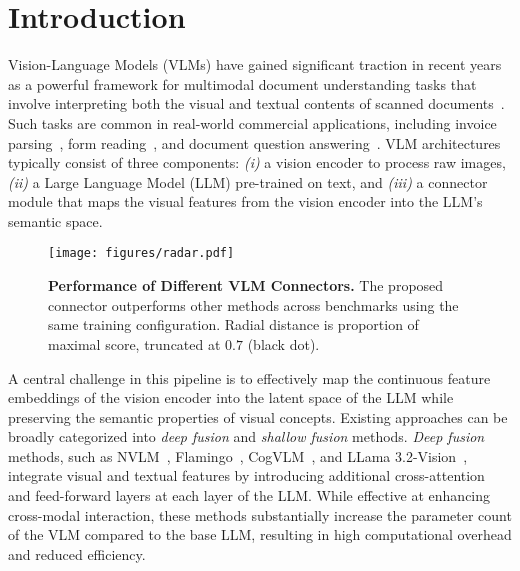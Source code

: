
\section{Introduction}
\label{section:introduction}


Vision-Language Models (VLMs) have gained significant traction in recent years as a powerful framework for multimodal document understanding tasks that involve interpreting both the visual and textual contents of scanned documents~\citep{donut, pix2struct, liu2023improvedllava, liu2024llavanext, hu2024mplugdocowl15unifiedstructure, wang2023docllmlayoutawaregenerativelanguage, rodriguez2024starvector}. Such tasks are common in real-world commercial applications, including invoice parsing~\citep{park2019cord}, form reading~\citep{funsd}, and document question answering~\citep{docvqa}. 
VLM architectures typically consist of three components:
\textit{(i)} a vision encoder to process raw images, \textit{(ii)} a Large Language Model (LLM) pre-trained on text, and \textit{(iii)} a connector module that maps the visual features from the vision encoder into the LLM's semantic space.

\begin{figure}
    \centering
    \texttt{[image: figures/radar.pdf]}
    \caption{\textbf{Performance of Different VLM Connectors.} The proposed \textit{\textbf{\alignmodule{}}} connector outperforms other methods across benchmarks using the same training configuration. Radial distance is proportion of maximal score, truncated at $0.7$ (black dot).}
    \label{fig:radar-plot-connectors}
\end{figure}

A central challenge in this pipeline is to effectively map the continuous feature embeddings of the vision encoder into the latent space of the LLM while preserving the semantic properties of visual concepts. Existing approaches can be broadly categorized into \emph{deep fusion} and \emph{shallow fusion} methods. \emph{Deep fusion} methods, such as NVLM~\citep{dai2024nvlm}, Flamingo~\citep{flamingo}, CogVLM~\citep{cogvlm:wang2023}, and LLama 3.2-Vision~\citep{llama3}, integrate visual and textual features by introducing additional cross-attention and feed-forward layers at each layer of the LLM. While effective at enhancing cross-modal interaction, these methods substantially increase the parameter count of the VLM compared to the base LLM, resulting in high computational overhead and reduced efficiency. 

